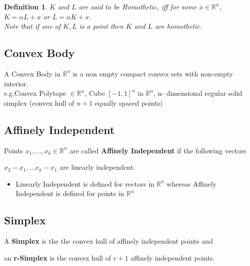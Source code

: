 \documentclass[oneside]{book}
\newtheorem{mydef}{Definition}
\begin{document}
 
 
 
 
 
 
 
 
 
 
 
 
 
 
 
 
 
 
 
 
 
 
 
 
 
 
 
 \begin{mydef} \label{d:1}
$K$ and $L$ are said to be Homothetic, iff for some $x  \in \mathbb{R}^n,$ \\
$K = \alpha L + x$ or $L=\alpha K+x $.\\
Note that if one of $K,L $ is a point then $K $ and $L$ are homothetic.
\end{mydef}





 \subsection{Convex Body}
 \label{ss:6}
A Convex Body in  $\mathbb{R}^n$  is a non empty compact convex sets with non-empty interior.\\
e.g.Convex Polytope $\in \mathbb{R}^n$, Cube $[-1,1]^{n}$  in $ \mathbb{R}^n$, n- dimensional regular solid simplex (convex hull of $n+1$ equally spaced points) 






\subsection{Affinely Independent}
\label{ss:7}
 Points $ x_1, \ldots ,x_k \in \mathbb{R}^n $ are called \textbf{Affinely Independent} if the following vectors \par
 $x_{2} - x_{1}, \ldots  x_{k} - x_{1} $ are linearly independent.
 
 \begin{itemize}
 \item Linearly Independent is defined for vectors in $\mathbb{R}^n $ whereas Affinely Independent is defined for points in $\mathbb{R}^n $
 \end{itemize}


 

   \subsection{Simplex} 
   \label{ss:8}
 A \textbf{Simplex} is the the convex hull of affinely independent points and \par 
  an \textbf{r-Simplex} is the convex hull of $r+ 1$ affinely independent points.
 
\end{document}
